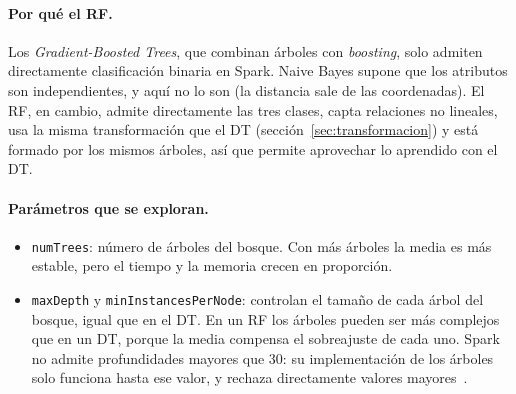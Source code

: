\documentclass[12pt,a4paper]{article}
\begin{document}
\paragraph{Por qué el \ac{RF}.} Los \textit{Gradient-Boosted Trees}, que
combinan árboles con \textit{boosting}, solo admiten directamente clasificación binaria
en Spark. Naive Bayes supone que los atributos son independientes, y aquí
no lo son (la distancia sale de las coordenadas). El \ac{RF}, en cambio, admite directamente las tres clases, capta
relaciones no lineales, usa la misma transformación que el \ac{DT}
(sección~\ref{sec:transformacion}) y está formado por los mismos árboles,
así que permite aprovechar lo aprendido con el \ac{DT}.

\paragraph{Parámetros que se exploran.}
\begin{itemize}
    \item \texttt{numTrees}: número de árboles del bosque. Con más árboles
    la media es más estable, pero el tiempo y la memoria crecen en
    proporción.
    \item \texttt{maxDepth} y \texttt{minInstancesPerNode}: controlan el
    tamaño de cada árbol del bosque, igual que en el \ac{DT}. En un \ac{RF}
    los árboles pueden ser más complejos que en un \ac{DT}, porque la media
    compensa el sobreajuste de cada uno. Spark no admite profundidades
    mayores que 30: su implementación de los árboles solo funciona hasta
    ese valor, y rechaza directamente valores mayores~\cite{spark_maxdepth}.
\end{itemize}
\end{document}
